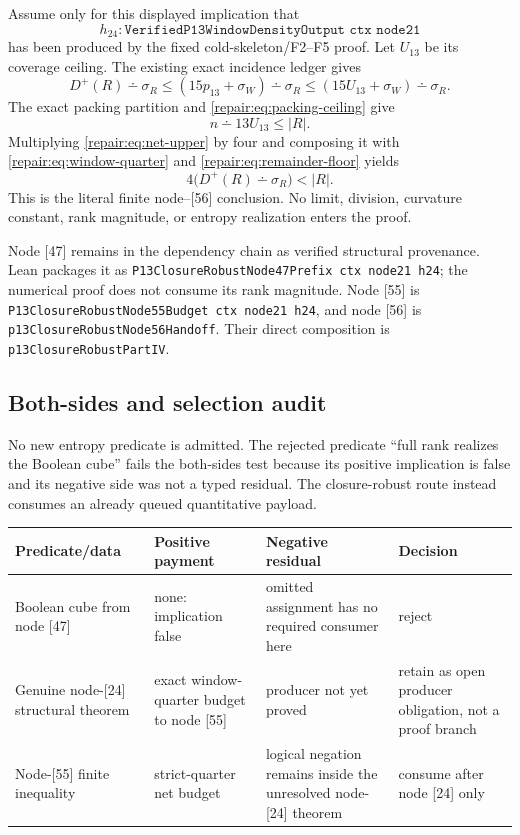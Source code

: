 Assume only for this displayed implication that
\[
 h_{24}:\texttt{VerifiedP13WindowDensityOutput ctx node21}
\]
has been produced by the fixed cold-skeleton/F2--F5 proof.  Let $U_{13}$ be its
coverage ceiling.  The existing exact incidence ledger gives
\begin{equation}
 D^+(R)\mathbin{\dotminus}\sigma_R
 \le (15p_{13}+\sigma_W)\mathbin{\dotminus}\sigma_R
 \le (15U_{13}+\sigma_W)\mathbin{\dotminus}\sigma_R.
 \label{repair:eq:net-upper}
\end{equation}
The exact packing partition and \eqref{repair:eq:packing-ceiling} give
\begin{equation}
 n\mathbin{\dotminus}13U_{13}\le |R|.
 \label{repair:eq:remainder-floor}
\end{equation}
Multiplying \eqref{repair:eq:net-upper} by four and composing it with
\eqref{repair:eq:window-quarter} and
\eqref{repair:eq:remainder-floor} yields
\begin{equation}
 4\bigl(D^+(R)\mathbin{\dotminus}\sigma_R\bigr)<|R|.
 \label{repair:eq:strict-quarter}
\end{equation}
This is the literal finite node--[56] conclusion.  No limit, division,
curvature constant, rank magnitude, or entropy realization enters the proof.

Node [47] remains in the dependency chain as verified structural provenance.
Lean packages it as
\texttt{P13ClosureRobustNode47Prefix ctx node21 h24}; the numerical proof does
not consume its rank magnitude.  Node [55] is
\texttt{P13ClosureRobustNode55Budget ctx node21 h24}, and node [56] is
\texttt{p13ClosureRobustNode56Handoff}.  Their direct composition is
\texttt{p13ClosureRobustPartIV}.

\subsection*{Both-sides and selection audit}

No new entropy predicate is admitted.  The rejected predicate
``full rank realizes the Boolean cube'' fails the both-sides test because its
positive implication is false and its negative side was not a typed residual.
The closure-robust route instead consumes an already queued quantitative
payload.

\begin{center}
\begin{tabular}{p{}p{}p{}p{}}
Predicate/data & Positive payment & Negative residual & Decision \\
\midrule
Boolean cube from node [47] & none: implication false & omitted assignment has no required consumer here & reject \\
Genuine node-[24] structural theorem & exact window-quarter budget to node [55] & producer not yet proved & retain as open producer obligation, not a proof branch \\
Node-[55] finite inequality & strict-quarter net budget & logical negation remains inside the unresolved node-[24] theorem & consume after node [24] only \\
\end{tabular}
\end{center}

